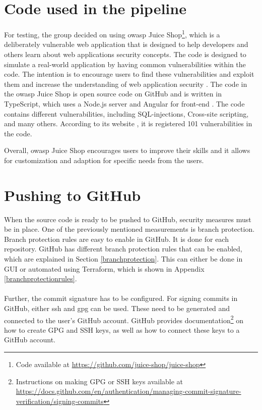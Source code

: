 \section{Code used in the pipeline}
For testing, the group decided on using \acrshort{owasp} Juice Shop\footnote{Code available at \url{https://github.com/juice-shop/juice-shop}}, which is a deliberately vulnerable web application that is designed to help developers and others learn about web applications security concepts. The code is designed to simulate a real-world application by having common vulnerabilities within the code. The intention is to encourage users to find these vulnerabilities and exploit them and increase the understanding of web application security \cite{owaspJuiceShop}.
The code in the \acrshort{owasp} Juice Shop is open source code on GitHub and is written in TypeScript, which uses a Node.js server and Angular for \gls{front-end} \cite{owaspJuiceShopCode}.
The code contains different vulnerabilities, including \gls{SQL-injection}s, \gls{Cross-site scripting}, and many others. According to its website \cite{owaspJuiceShop}, it is registered 101 vulnerabilities in the code.

Overall, \acrshort{owasp} Juice Shop encourages users to improve their skills and it allows for customization and adaption for specific needs from the users.

 
\section{Pushing to GitHub}
When the source code is ready to be pushed to GitHub, security measures must be in place. One of the previously mentioned measurements is branch protection. Branch protection rules are easy to enable in GitHub. It is done for each repository. GitHub has different branch protection rules that can be enabled, which are explained in Section \ref{branchprotection}. This can either be done in \gls{GUI} or automated using Terraform, which is shown in Appendix \ref{branchprotectionrules}. 
\\~\\
Further, the commit signature has to be configured. For signing commits in GitHub, either \acrshort{ssh} and \acrshort{gpg} can be used. These need to be generated and connected to the user's GitHub account.
GitHub provides documentation\footnote{Instructions on making GPG or SSH keys available at \url{https://docs.github.com/en/authentication/managing-commit-signature-verification/signing-commits}} on how to create GPG and SSH keys, as well as how to connect these keys to a GitHub account.

